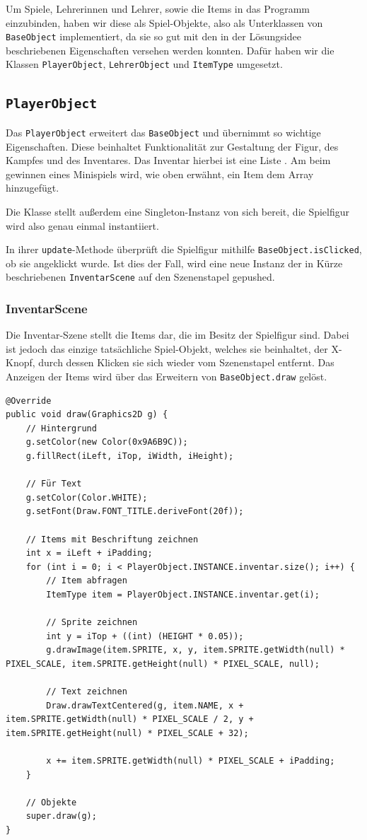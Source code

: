 
Um Spiele, Lehrerinnen und Lehrer, sowie die Items in das Programm einzubinden, haben wir diese als Spiel-Objekte, also als Unterklassen von \texttt{BaseObject} implementiert, da sie so gut mit den in der Lösungsidee beschriebenen Eigenschaften versehen werden konnten. Dafür haben wir die Klassen \texttt{PlayerObject}, \texttt{LehrerObject} und \texttt{ItemType} umgesetzt.

\subsection{\texttt{PlayerObject}}
Das \texttt{PlayerObject} erweitert das \texttt{BaseObject} und übernimmt so wichtige Eigenschaften. Diese beinhaltet Funktionalität zur Gestaltung der Figur, des Kampfes und des Inventares. Das Inventar hierbei ist eine Liste . Am beim gewinnen eines Minispiels wird, wie oben erwähnt, ein Item dem Array hinzugefügt.

Die Klasse stellt außerdem eine Singleton-Instanz von sich bereit, die
Spielfigur wird also genau einmal instantiiert.

In ihrer \texttt{update}-Methode überprüft die Spielfigur mithilfe \texttt{BaseObject.isClicked}, ob sie angeklickt wurde. Ist dies der Fall,
wird eine neue Instanz der in Kürze beschriebenen \texttt{InventarScene}
auf den Szenenstapel gepushed.


\subsubsection{InventarScene}

Die Inventar-Szene stellt die Items dar, die im Besitz der Spielfigur sind.
Dabei ist jedoch das einzige tatsächliche Spiel-Objekt, welches sie beinhaltet,
der \glqq{}X\grqq{}-Knopf, durch dessen Klicken sie sich wieder vom Szenenstapel
entfernt. Das Anzeigen der Items wird über das Erweitern von \texttt{BaseObject.draw}
gelöst.

\begin{lstlisting}
@Override
public void draw(Graphics2D g) {
	// Hintergrund
	g.setColor(new Color(0x9A6B9C));
	g.fillRect(iLeft, iTop, iWidth, iHeight);
	
	// Für Text
	g.setColor(Color.WHITE);
	g.setFont(Draw.FONT_TITLE.deriveFont(20f));
	
	// Items mit Beschriftung zeichnen
	int x = iLeft + iPadding;
	for (int i = 0; i < PlayerObject.INSTANCE.inventar.size(); i++) {
		// Item abfragen
		ItemType item = PlayerObject.INSTANCE.inventar.get(i);
		
		// Sprite zeichnen
		int y = iTop + ((int) (HEIGHT * 0.05));
		g.drawImage(item.SPRITE, x, y, item.SPRITE.getWidth(null) * PIXEL_SCALE, item.SPRITE.getHeight(null) * PIXEL_SCALE, null);
		
		// Text zeichnen
		Draw.drawTextCentered(g, item.NAME, x + item.SPRITE.getWidth(null) * PIXEL_SCALE / 2, y + item.SPRITE.getHeight(null) * PIXEL_SCALE + 32);
		
		x += item.SPRITE.getWidth(null) * PIXEL_SCALE + iPadding;
	}
	
	// Objekte
	super.draw(g);
}
\end{lstlisting}

